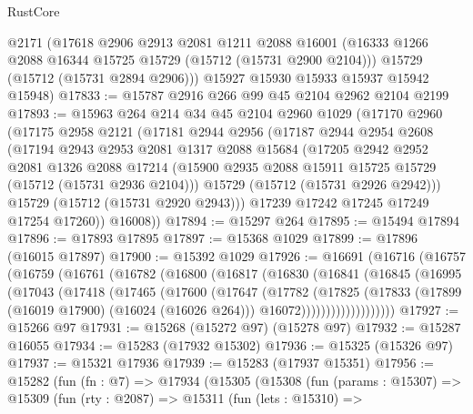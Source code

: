 \begin{lexlean}{RustCore}
\begin{coremodule}
      @2171
      (@17618
        @2906
        @2913
        @2081
        @1211
        @2088
        @16001
        (@16333 @1266 @2088 @16344 @15725 @15729 (@15712 (@15731 @2900 @2104)))
        @15729
        (@15712 (@15731 @2894 @2906)))
      @15927
      @15930
      @15933
      @15937
      @15942
      @15948)
@17833 := @15787 @2916 @266 @99 @45 @2104 @2962 @2104 @2199
@17893 := @15963
    @264
    @214
    @34
    @45
    @2104
    @2960
    @1029
    (@17170
      @2960
      (@17175
        @2958
        @2121
        (@17181
          @2944
          @2956
          (@17187
            @2944
            @2954
            @2608
            (@17194
              @2943
              @2953
              @2081
              @1317
              @2088
              @15684
              (@17205
                @2942
                @2952
                @2081
                @1326
                @2088
                @17214
                (@15900 @2935 @2088 @15911 @15725 @15729 (@15712 (@15731 @2936 @2104)))
                @15729
                (@15712 (@15731 @2926 @2942)))
              @15729
              (@15712 (@15731 @2920 @2943)))
            @17239
            @17242
            @17245
            @17249
            @17254
            @17260))
        @16008))
@17894 := @15297 @264
@17895 := @15494 @17894
@17896 := @17893 @17895
@17897 := @15368 @1029
@17899 := @17896 (@16015 @17897)
@17900 := @15392 @1029
@17926 := @16691
    (@16716
      (@16757
        (@16759
          (@16761
            (@16782
              (@16800
                (@16817
                  (@16830
                    (@16841
                      (@16845
                        (@16995
                          (@17043
                            (@17418
                              (@17465
                                (@17600
                                  (@17647
                                    (@17782
                                      (@17825
                                        (@17833
                                          (@17899 (@16019 @17900) (@16024 (@16026 @264)))
                                          @16072)))))))))))))))))))
@17927 := @15266 @97
@17931 := @15268 (@15272 @97) (@15278 @97)
@17932 := @15287 @16055
@17934 := @15283 (@17932 @15302)
@17936 := @15325 (@15326 @97)
@17937 := @15321 @17936
@17939 := @15283 (@17937 @15351)
@17956 := @15282
    (fun (fn : @7) =>
    @17934
      (@15305
        (@15308
          (fun (params : @15307) =>
          @15309
            (fun (rty : @2087) =>
            @15311
              (fun (lets : @15310) =>

\end{coremodule}
\end{lexlean}
